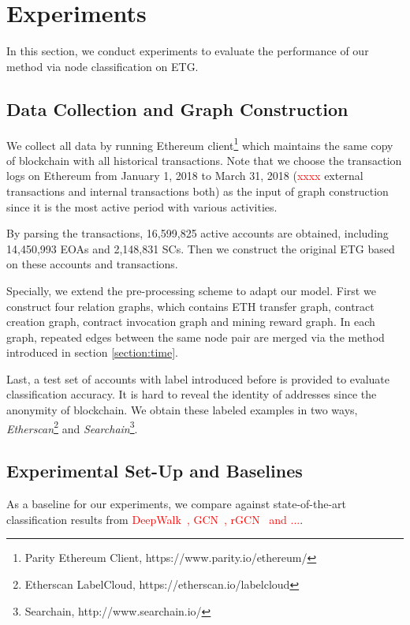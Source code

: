 
\section{Experiments}
In this section, we conduct experiments to evaluate the performance of our method via node classification on ETG.

\subsection{Data Collection and Graph Construction}
We collect all data by running Ethereum client\footnote{Parity Ethereum Client, https://www.parity.io/ethereum/} which maintains the same copy of blockchain with all historical transactions. Note that we choose the transaction logs on Ethereum from January 1, 2018 to March 31, 2018 (\textcolor{red}{xxxx} external transactions and internal transactions both) as the input of graph construction since it is the most active period with various activities.

By parsing the transactions, 16,599,825 active accounts are obtained, including 14,450,993 EOAs and 2,148,831 SCs. Then we construct the original ETG based on these accounts and transactions.

Specially, we extend the pre-processing scheme to adapt our model. First we construct four relation graphs, which contains ETH transfer graph, contract creation graph, contract invocation graph and mining reward graph. In each graph, repeated edges between the same node pair are merged via the method introduced in section \ref{section:time}.

Last, a test set of accounts with label introduced before is provided to evaluate classification accuracy. It is hard to reveal the identity of addresses since the anonymity of blockchain. We obtain these labeled examples in two ways, \emph{Etherscan}\footnote{Etherscan LabelCloud, https://etherscan.io/labelcloud} and \emph{Searchain}\footnote{Searchain, http://www.searchain.io/}.




\subsection{Experimental Set-Up and Baselines}
As a baseline for our experiments, we compare against state-of-the-art classification results from \textcolor{red}{DeepWalk~\cite{perozzi2014deepwalk}, GCN~\cite{kipf2016semi}, rGCN~\cite{schlichtkrull2018modeling} and ...}.


